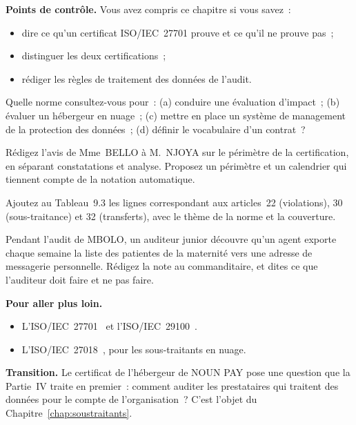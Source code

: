 \begin{boxinfo}
\textbf{Points de contrôle.} Vous avez compris ce chapitre si vous savez~:
\begin{itemize}
    \item dire ce qu'un certificat ISO/IEC~27701 prouve et ce qu'il ne prouve
          pas~;
    \item distinguer les deux certifications~;
    \item rédiger les règles de traitement des données de l'audit.
\end{itemize}
\end{boxinfo}

\begin{boxexo}[title={\ding{45}\quad Exercice~9.1. Quelle norme \niveaubase}]
Quelle norme consultez-vous pour~: (a) conduire une évaluation d'impact~;
(b) évaluer un hébergeur en nuage~; (c) mettre en place un système de
management de la protection des données~; (d) définir le vocabulaire d'un
contrat~?
\end{boxexo}

\begin{boxexo}[title={\ding{45}\quad Exercice~9.2. Le périmètre de NOUN PAY \niveaumoyen}]
Rédigez l'avis de Mme~BELLO à M.~NJOYA sur le périmètre de la
certification, en séparant constatations et analyse. Proposez un périmètre
et un calendrier qui tiennent compte de la notation automatique.
\end{boxexo}

\begin{boxexo}[title={\ding{45}\quad Exercice~9.3. Compléter la correspondance \niveaumoyen}]
Ajoutez au Tableau~9.3 les lignes correspondant aux articles~22
(violations), 30 (sous-traitance) et 32 (transferts), avec le thème de la
norme et la couverture.
\end{boxexo}

\begin{boxexo}[title={\ding{45}\quad Exercice~9.4. Une découverte \niveauexpert}]
Pendant l'audit de MBOLO, un auditeur junior découvre qu'un agent exporte
chaque semaine la liste des patientes de la maternité vers une adresse de
messagerie personnelle. Rédigez la note au commanditaire, et dites ce que
l'auditeur doit faire et ne pas faire.
\end{boxexo}

\bigskip

\begin{boxinfo}
\textbf{Pour aller plus loin.}
\begin{itemize}
    \item L'ISO/IEC~27701~\cite{iso27701} et l'ISO/IEC~29100~\cite{iso29100}.
    \item L'ISO/IEC~27018~\cite{iso27018}, pour les sous-traitants en nuage.
\end{itemize}
\end{boxinfo}

\begin{boxinfo}
\textbf{Transition.} Le certificat de l'hébergeur de NOUN PAY pose une
question que la Partie~IV traite en premier~: comment auditer les
prestataires qui traitent des données pour le compte de l'organisation~?
C'est l'objet du Chapitre~\ref{chap:soustraitants}.
\end{boxinfo}
